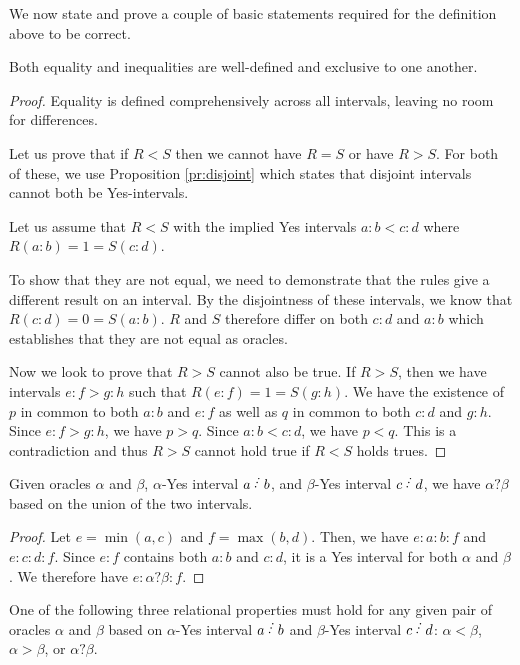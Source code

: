 \documentclass[12pt]{article}
\begin{document}
We now state and prove a couple of basic statements required for the definition above to be correct. 

\begin{proposition}\label{pr:wd}
Both equality and inequalities are well-defined and exclusive to one another.  
\end{proposition}

\begin{proof}
Equality is defined comprehensively across all intervals, leaving no room for differences. 

Let us prove that if $R < S$ then we cannot have $R=S$ or have $R > S$. For both of these, we use Proposition \ref{pr:disjoint} which states that disjoint intervals cannot both be Yes-intervals. 

Let us assume that $R<S$ with the implied Yes intervals $a:b < c:d$ where $R(a:b)=1 =S(c:d)$.

To show that they are not equal, we need to demonstrate that the rules give a different result on an interval. By the disjointness of these intervals, we know that $R(c:d) = 0 = S(a:b)$. $R$ and $S$ therefore differ on both $c:d$ and $a:b$ which establishes that they are not equal as oracles.  

Now we look to prove that $R>S$ cannot also be true. If $R > S$, then we have intervals $e:f > g:h$ such that $R(e:f) = 1 = S(g:h)$. We have the existence of $p$ in common to both $a:b$ and $e:f$ as well as $q$ in common to both $c:d$ and $g:h$. Since $e:f > g:h$, we have $p > q$. Since $a:b < c:d$, we have $p < q$. This is a contradiction and thus $R>S$ cannot hold true if $R<S$ holds trues.
\end{proof}

\begin{proposition}
    Given oracles $\alpha$ and $\beta$,  $\alpha$-Yes interval $a\lte b$, and $\beta$-Yes interval $c\lte d$, we have $\alpha ? \beta$ based on the union of the two intervals.  
\end{proposition}

\begin{proof}
Let $e= \min(a,c)$ and $f = \max(b,d)$. Then, we have $e:a:b:f$ and $e:c:d:f$. Since $e:f$ contains both $a:b$ and $c:d$, it is a Yes interval for both $\alpha$ and $\beta$. We therefore have $e:\alpha?\beta:f$.
\end{proof}

\begin{proposition}
One of the following three relational properties must hold for any given pair of oracles $\alpha$ and $\beta$ based on $\alpha$-Yes interval $a \lte b$ and $\beta$-Yes interval $c \lte d$: $\alpha < \beta$,  $\alpha > \beta$, or $\alpha ? \beta$. 
\end{proposition}
\end{document}
